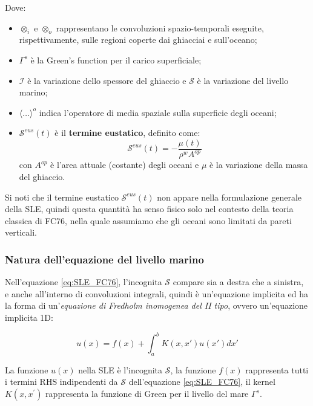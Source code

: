 \documentclass[a4paper,12pt]{book}
\begin{document}
\noindent
Dove:
\begin{itemize}
    \item $\otimes_i$ e $\otimes_o$ rappresentano le convoluzioni spazio-temporali eseguite, rispettivamente, sulle regioni coperte dai ghiacciai e sull'oceano;
    \item $\Gamma^s$ è la Green's function per il carico superficiale;
    \item $\mathcal{I}$ è la variazione dello spessore del ghiaccio e $\mathcal{S}$ è la variazione del livello marino;
    \item $\langle \dots \rangle^o$ indica l'operatore di media spaziale sulla superficie degli oceani;
    \item $\mathcal{S}^{eus}(t)$ è il \textbf{termine eustatico}, definito come:
    \begin{equation}
        \mathcal{S}^{eus}(t) = - \frac{\mu(t)}{\rho^w A^{op}}
    \end{equation}
    con $A^{op}$ è l'area attuale (costante) degli oceani e $\mu$ è la variazione della massa del ghiaccio.
\end{itemize}

\noindent
Si noti che il termine eustatico $\mathcal{S}^{eus}(t)$ non appare nella formulazione generale della SLE,
quindi questa quantità ha senso fisico solo nel contesto della teoria classica di FC76, nella quale
assumiamo che gli oceani sono limitati da pareti verticali.

\subsubsection{\textcolor{colore7}{Natura dell'equazione del livello marino}}

Nell'equazione \ref{eq:SLE_FC76}, l'incognita $\mathcal{S}$ compare sia a destra che a sinistra, e anche all'interno di convoluzioni integrali,
quindi è un'equazione implicita ed ha la forma 
di un'\textit{equazione di Fredholm inomogenea del II tipo}, ovvero un'equazione implicita 1D:

\begin{equation}
    u(x) = f(x) + \int_a^b K(x,x')u(x') dx'
\end{equation}

\noindent
La funzione $u(x)$ nella SLE è l'incognita $\mathcal{S}$,
la funzione $f(x)$ rappresenta tutti i termini RHS indipendenti da $\mathcal{S}$ dell'equazione \ref{eq:SLE_FC76},
il kernel $K(x, x^\prime)$ rappresenta la funzione di Green per il livello del mare $\Gamma^s$.\\
\end{document}

